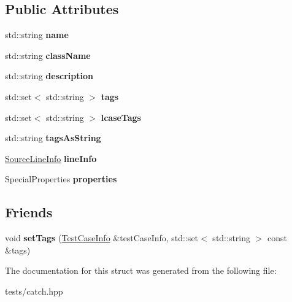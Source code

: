 \subsection*{Public Attributes}
\begin{DoxyCompactItemize}
\item 
\mbox{\label{struct_catch_1_1_test_case_info_a463794e2f5cfead307c93efd134ade36}} 
std\+::string {\bfseries name}
\item 
\mbox{\label{struct_catch_1_1_test_case_info_a1a5e0825132a38d091defdebbf2f8ce9}} 
std\+::string {\bfseries class\+Name}
\item 
\mbox{\label{struct_catch_1_1_test_case_info_a37fe2db9425bc45f6a33893eac31198e}} 
std\+::string {\bfseries description}
\item 
\mbox{\label{struct_catch_1_1_test_case_info_a045f62e7719a8760a5b456f7fd2dc97c}} 
std\+::set$<$ std\+::string $>$ {\bfseries tags}
\item 
\mbox{\label{struct_catch_1_1_test_case_info_a0ed3864a313e8ddc3ae38431be5be9ae}} 
std\+::set$<$ std\+::string $>$ {\bfseries lcase\+Tags}
\item 
\mbox{\label{struct_catch_1_1_test_case_info_ac65c2d36fd36f71e9bf782b2ea245c64}} 
std\+::string {\bfseries tags\+As\+String}
\item 
\mbox{\label{struct_catch_1_1_test_case_info_aa9407b7f442655b51a2aad24b3fa2fd3}} 
\hyperlink{struct_catch_1_1_source_line_info}{Source\+Line\+Info} {\bfseries line\+Info}
\item 
\mbox{\label{struct_catch_1_1_test_case_info_afc1e84bd7a2e180895a06d9131302af0}} 
Special\+Properties {\bfseries properties}
\end{DoxyCompactItemize}
\subsection*{Friends}
\begin{DoxyCompactItemize}
\item 
\mbox{\label{struct_catch_1_1_test_case_info_addc10c770e56f49da5baa0c76cf25bd5}} 
void {\bfseries set\+Tags} (\hyperlink{struct_catch_1_1_test_case_info}{Test\+Case\+Info} \&test\+Case\+Info, std\+::set$<$ std\+::string $>$ const \&tags)
\end{DoxyCompactItemize}


The documentation for this struct was generated from the following file\+:\begin{DoxyCompactItemize}
\item 
tests/catch.\+hpp\end{DoxyCompactItemize}
